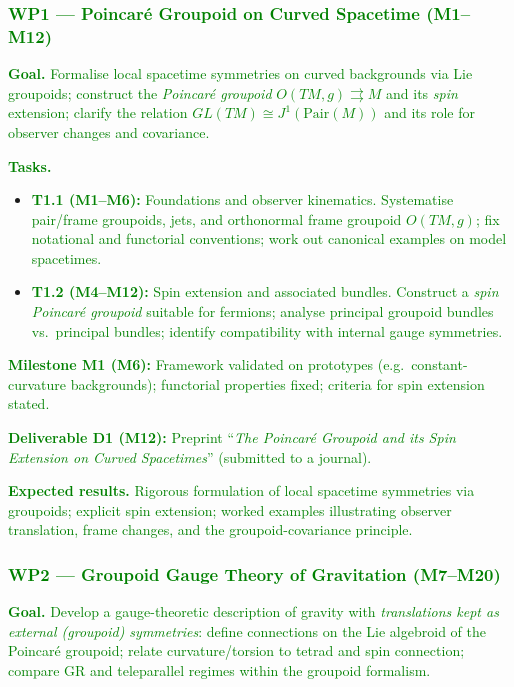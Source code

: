 \documentclass[11pt,draftproposal]{msca-pf}
\begin{document}
\subsubsection*{\textcolor{green}{WP1 — Poincaré Groupoid on Curved Spacetime (M1–M12)}}
\textcolor{green}{\textbf{Goal.} Formalise local spacetime symmetries on curved backgrounds via Lie groupoids; construct the \emph{Poincaré groupoid} $O(TM,g)\rightrightarrows M$ and its \emph{spin} extension; clarify the relation $GL(TM)\cong J^1(\mathrm{Pair}(M))$ and its role for observer changes and covariance.}

\textcolor{green}{\textbf{Tasks.}}
\begin{itemize}[noitemsep,topsep=1pt]
  \item \textcolor{green}{\textbf{T1.1 (M1–M6):} Foundations and observer kinematics. Systematise pair/frame groupoids, jets, and orthonormal frame groupoid $O(TM,g)$; fix notational and functorial conventions; work out canonical examples on model spacetimes.}
  \item \textcolor{green}{\textbf{T1.2 (M4–M12):} Spin extension and associated bundles. Construct a \emph{spin Poincaré groupoid} suitable for fermions; analyse principal groupoid bundles vs.\ principal bundles; identify compatibility with internal gauge symmetries.}
\end{itemize}

\textcolor{green}{\textbf{Milestone M1 (M6):} Framework validated on prototypes (e.g.\ constant-curvature backgrounds); functorial properties fixed; criteria for spin extension stated.}

\textcolor{green}{\textbf{Deliverable D1 (M12):} Preprint ``\emph{The Poincaré Groupoid and its Spin Extension on Curved Spacetimes}'' (submitted to a journal).}

\textcolor{green}{\textbf{Expected results.} Rigorous formulation of local spacetime symmetries via groupoids; explicit spin extension; worked examples illustrating observer translation, frame changes, and the groupoid-covariance principle.}

\subsubsection*{\textcolor{green}{WP2 — Groupoid Gauge Theory of Gravitation (M7–M20)}}
\textcolor{green}{\textbf{Goal.} Develop a gauge-theoretic description of gravity with \emph{translations kept as external (groupoid) symmetries}: define connections on the Lie algebroid of the Poincaré groupoid; relate curvature/torsion to tetrad and spin connection; compare GR and teleparallel regimes within the groupoid formalism.}
\end{document}
